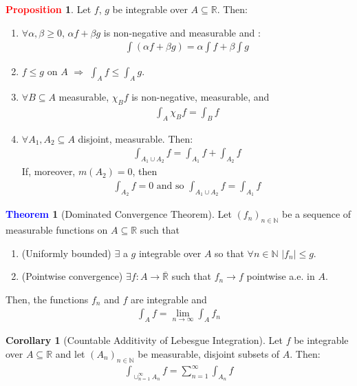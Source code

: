 \documentclass[reqno,11pt]{amsart}
\theoremstyle{definition}
\newcommand{\bb}[1]{\mathbb{#1}}
\newtheorem{theorem}{\textcolor{blue}{Theorem}}
\newtheorem{corollary}{Corollary}
\theoremstyle{definition}
\newtheorem{prop}{\textcolor{red}{Proposition}}
\theoremstyle{remark}
\begin{document}
\begin{prop} Let $f$, $g$ be integrable over $A \subseteq \bb{R}$. Then: 
\begin{enumerate}[noitemsep]
	\item $\forall \alpha, \beta \geq 0$, $\alpha f + \beta g$ is non-negative and measurable and :
	\begin{align*}
		\int (\alpha f + \beta g) = \alpha \int f + \beta \int g 	
	\end{align*}
	\item $f \leq g$ on $A$ $\Rightarrow$ $\int_A f \leq \int_A g$. 
	\item $\forall B \subseteq A$ measurable, $\chi_B f$ is non-negative, measurable, and 
	\begin{align*}
		\int_A \chi_B f = \int_B f 	
	\end{align*}
	\item $\forall A_1, A_2 \subseteq A$ disjoint, measurable. Then: 
	\begin{align*}
		\int_{A_1 \cup A_2} f = \int_{A_1} f + \int_{A_2} f 	
	\end{align*}
	If, moreover, $m(A_2) = 0$, then
	\begin{align*}
		\int_{A_2} f = 0 \mbox{ and so } \int_{A_1 \cup A_2}f = \int_{A_1} f	
	\end{align*}
\end{enumerate}
\end{prop}

\begin{theorem}[Dominated Convergence Theorem]
	Let $(f_n)_{n \in \bb{N}}$ be a sequence of measurable functions on $A \subseteq \bb{R}$ such that 
	\begin{enumerate}[noitemsep]
		\item (Uniformly bounded) $\exists$ a $g$ integrable over $A$ so that $\forall n \in \bb{N}$ $|f_n| \leq g$. 
		\item (Pointwise convergence) $\exists f: A \rightarrow \overline{\bb{R}}$ such that $f_n \rightarrow f$ pointwise a.e. in $A$. 
	\end{enumerate}
	Then, the functions $f_n$ and $f$ are integrable and
	\begin{align*}
		\int_A f = \lim_{n \rightarrow \infty} \int_A f_n 	
	\end{align*}
\end{theorem}

\begin{corollary}[Countable Additivity of Lebesgue Integration]
	Let $f$ be integrable over $A \subseteq \bb{R}$ and let $(A_n)_{n \in \bb{N}}$ be measurable, disjoint subsets of $A$. Then: 
	\begin{align}
		\int_{\cup_{n=1}^\infty A_n} f = \sum_{n =1}^\infty \int_{A_n} f  
	\end{align}
\end{corollary}
\end{document}
